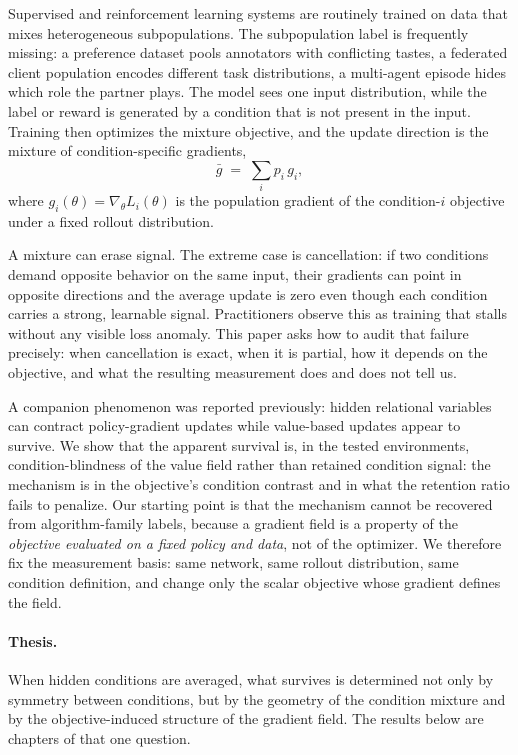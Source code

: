 \documentclass{article}
\newcommand{\gbar}{\bar{g}}
\begin{document}
Supervised and reinforcement learning systems are routinely trained on data
that mixes heterogeneous subpopulations. The subpopulation label is frequently
missing: a preference dataset pools annotators with conflicting tastes, a
federated client population encodes different task distributions, a
multi-agent episode hides which role the partner plays. The model sees one
input distribution, while the label or reward is generated by a condition that
is not present in the input. Training then optimizes the mixture objective, and
the update direction is the mixture of condition-specific gradients,
\begin{equation}
\gbar \;=\; \sum_i p_i \, g_i ,
\end{equation}
where $g_i(\theta)=\nabla_\theta L_i(\theta)$ is the population gradient of the
condition-$i$ objective under a fixed rollout distribution.

A mixture can erase signal. The extreme case is cancellation: if two conditions
demand opposite behavior on the same input, their gradients can point in
opposite directions and the average update is zero even though each condition
carries a strong, learnable signal. Practitioners observe this as training that
stalls without any visible loss anomaly. This paper asks how to audit that
failure precisely: when cancellation is exact, when it is partial, how it
depends on the objective, and what the resulting measurement does and does not
tell us.

A companion phenomenon was reported previously: hidden relational variables
can contract policy-gradient updates while value-based updates appear to
survive. We show that the apparent survival is, in the tested environments,
condition-blindness of the value field rather than retained condition signal:
the mechanism is in the objective's condition contrast and in what the
retention ratio fails to penalize. Our starting point is that the
mechanism cannot be recovered from algorithm-family labels, because a gradient
field is a property of the \emph{objective evaluated on a fixed policy and
data}, not of the optimizer. We therefore fix the measurement basis: same
network, same rollout distribution, same condition definition, and change only
the scalar objective whose gradient defines the field.

\paragraph{Thesis.}
When hidden conditions are averaged, what survives is determined not only by
symmetry between conditions, but by the geometry of the condition mixture and
by the objective-induced structure of the gradient field. The results below
are chapters of that one question.
\end{document}
